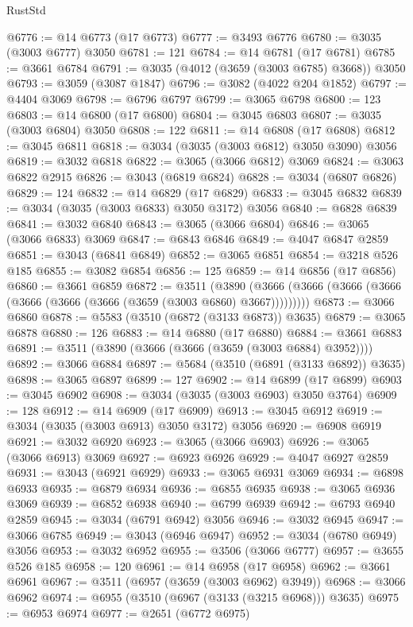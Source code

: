 \begin{lexlean}{RustStd}
\begin{coremodule}
@6776 := @14 @6773 (@17 @6773)
@6777 := @3493 @6776
@6780 := @3035 (@3003 @6777) @3050
@6781 := 121
@6784 := @14 @6781 (@17 @6781)
@6785 := @3661 @6784
@6791 := @3035 (@4012 (@3659 (@3003 @6785) @3668)) @3050
@6793 := @3059 (@3087 @1847)
@6796 := @3082 (@4022 @204 @1852)
@6797 := @4404 @3069
@6798 := @6796 @6797
@6799 := @3065 @6798
@6800 := 123
@6803 := @14 @6800 (@17 @6800)
@6804 := @3045 @6803
@6807 := @3035 (@3003 @6804) @3050
@6808 := 122
@6811 := @14 @6808 (@17 @6808)
@6812 := @3045 @6811
@6818 := @3034 (@3035 (@3003 @6812) @3050 @3090) @3056
@6819 := @3032 @6818
@6822 := @3065 (@3066 @6812) @3069
@6824 := @3063 @6822 @2915
@6826 := @3043 (@6819 @6824)
@6828 := @3034 (@6807 @6826)
@6829 := 124
@6832 := @14 @6829 (@17 @6829)
@6833 := @3045 @6832
@6839 := @3034 (@3035 (@3003 @6833) @3050 @3172) @3056
@6840 := @6828 @6839
@6841 := @3032 @6840
@6843 := @3065 (@3066 @6804)
@6846 := @3065 (@3066 @6833) @3069
@6847 := @6843 @6846
@6849 := @4047 @6847 @2859
@6851 := @3043 (@6841 @6849)
@6852 := @3065 @6851
@6854 := @3218 @526 @185
@6855 := @3082 @6854
@6856 := 125
@6859 := @14 @6856 (@17 @6856)
@6860 := @3661 @6859
@6872 := @3511
    (@3890 (@3666 (@3666 (@3666 (@3666 (@3666 (@3666 (@3666 (@3659 (@3003 @6860) @3667)))))))))
@6873 := @3066 @6860
@6878 := @5583 (@3510 (@6872 (@3133 @6873)) @3635)
@6879 := @3065 @6878
@6880 := 126
@6883 := @14 @6880 (@17 @6880)
@6884 := @3661 @6883
@6891 := @3511 (@3890 (@3666 (@3666 (@3659 (@3003 @6884) @3952))))
@6892 := @3066 @6884
@6897 := @5684 (@3510 (@6891 (@3133 @6892)) @3635)
@6898 := @3065 @6897
@6899 := 127
@6902 := @14 @6899 (@17 @6899)
@6903 := @3045 @6902
@6908 := @3034 (@3035 (@3003 @6903) @3050 @3764)
@6909 := 128
@6912 := @14 @6909 (@17 @6909)
@6913 := @3045 @6912
@6919 := @3034 (@3035 (@3003 @6913) @3050 @3172) @3056
@6920 := @6908 @6919
@6921 := @3032 @6920
@6923 := @3065 (@3066 @6903)
@6926 := @3065 (@3066 @6913) @3069
@6927 := @6923 @6926
@6929 := @4047 @6927 @2859
@6931 := @3043 (@6921 @6929)
@6933 := @3065 @6931 @3069
@6934 := @6898 @6933
@6935 := @6879 @6934
@6936 := @6855 @6935
@6938 := @3065 @6936 @3069
@6939 := @6852 @6938
@6940 := @6799 @6939
@6942 := @6793 @6940 @2859
@6945 := @3034 (@6791 @6942) @3056
@6946 := @3032 @6945
@6947 := @3066 @6785
@6949 := @3043 (@6946 @6947)
@6952 := @3034 (@6780 @6949) @3056
@6953 := @3032 @6952
@6955 := @3506 (@3066 @6777)
@6957 := @3655 @526 @185
@6958 := 120
@6961 := @14 @6958 (@17 @6958)
@6962 := @3661 @6961
@6967 := @3511 (@6957 (@3659 (@3003 @6962) @3949))
@6968 := @3066 @6962
@6974 := @6955 (@3510 (@6967 (@3133 (@3215 @6968))) @3635)
@6975 := @6953 @6974
@6977 := @2651 (@6772 @6975)

\end{coremodule}
\end{lexlean}
